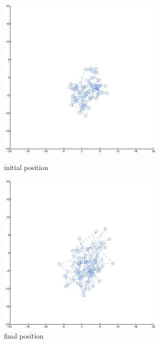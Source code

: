 \documentclass{article}
\begin{document}
\begin{figure}[H]
	\begin{minipage}[t]{0.5\textwidth}
		\centering
	
		
		\includegraphics[width=3.2in]{1.eps}
		\caption{initial position}
	\end{minipage}%
	\begin{minipage}[t]{0.5\textwidth}
		\centering
		\includegraphics[width=3.2in]{2.eps}
		\caption{final position}
		
	\end{minipage}
\end{figure}
\end{document}
